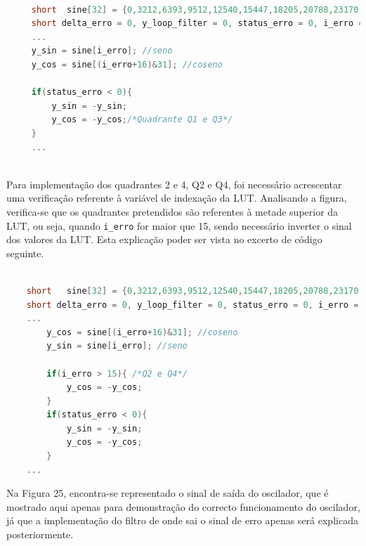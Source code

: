 \documentclass[11pt]{article}
\numberwithin{equation}{section}
\begin{document}
 \begin{lstlisting}[language=C]
 
	 short	sine[32] = {0,3212,6393,9512,12540,15447,18205,20788,23170,25330,27246,28899,30274,31357,		32138,32610,32767,32610,32138,31357,30274,28899,27246,25330,23170,20788,18205,		15447,12540,9512,6393,3212}; 
	 short delta_erro = 0, y_loop_filter = 0, status_erro = 0, i_erro = 0, y_sin = 0,y_coseno = 0;
	 ...
	 y_sin = sine[i_erro]; //seno
	 y_cos = sine[(i_erro+16)&31]; //coseno
	 
	 if(status_erro < 0){
		 y_sin = -y_sin;
		 y_cos = -y_cos;/*Quadrante Q1 e Q3*/
	 }	
	 ...
 
 \end{lstlisting}
 
  Para implementação dos quadrantes 2 e 4, Q2 e Q4, foi necessário acrescentar uma verificação referente à variável de	indexação da LUT. Analisando a figura, verifica-se que os quadrantes pretendidos são referentes à metade superior da LUT, ou seja, quando \texttt{i\_erro} for maior que 15, sendo necessário inverter o sinal dos valores da LUT. Esta explicação poder ser vista no excerto de código seguinte.
  
\begin{lstlisting}[language=C]

	short	sine[32] = {0,3212,6393,9512,12540,15447,18205,20788,23170,25330,27246,28899,30274,31357,		32138,32610,32767,32610,32138,31357,30274,28899,27246,25330,23170,20788,18205,	15447,12540,9512,6393,3212}; 
	short delta_erro = 0, y_loop_filter = 0, status_erro = 0, i_erro = 0, y_cos = 0, y_sin = 0;
	...
		y_cos = sine[(i_erro+16)&31]; //coseno
		y_sin = sine[i_erro]; //seno

		if(i_erro > 15){ /*Q2 e Q4*/
			y_cos = -y_cos;
		}
		if(status_erro < 0){
			y_sin = -y_sin;
			y_cos = -y_cos;
		}	
	...
\end{lstlisting}

Na Figura 25, encontra-se representado o sinal de saída do oscilador, que é mostrado aqui apenas para demonstração do correcto funcionamento do oscilador, já que a implementação do filtro de onde sai o sinal de erro apenas será explicada posteriormente. 
\end{document}
